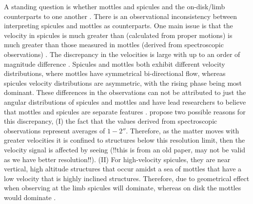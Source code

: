 \documentclass[12pt]{ociamthesis}
\newcommand{\np}{\\ \\}
\begin{document}
A standing question is whether mottles and spicules and the on-disk/limb counterparts to one another \citep{Tsiropoula1993A}. There is an observational inconsistency between interpreting spicules and mottles as counterparts. One main issue is that the velocity in spicules is much greater than (calculated from proper motions) is much greater than those measured in mottles (derived from spectroscopic observations) \citep{Grossmann1992AA264236G, Christopoulou2001SoPh19961C}. The discrepancy in the velocities is large with up to an order of magnitude difference \citep{Grossmann1973SoPh28319G}. Spicules and mottles both exhibit different velocity distributions, where mottles have symmetrical bi-directional flow, whereas spicules velocity distributions are asymmetric, with the rising phase being most dominant. These differences in the observations can not be attributed to just the angular distributions of spicules and mottles \citep{Grossmann1992AA264236G} and have lead researchers to believe that mottles and spicules are separate features \citep{Christopoulou2001SoPh19961C}. \cite{Christopoulou2001SoPh19961C} propose two possible reasons for this discrepancy, (I) the fact that the values derived from spectroscopic observations represent averages of $1-\ang{;;2}$. Therefore, as the matter moves with greater velocities it is confined to structures below this resolution limit, then the velocity signal is affected by seeing ({\color{green}!!this is from an old paper, may not be valid as we have better resolution!!)}. (II) For high-velocity spicules, they are near vertical, high altitude structures that occur amidst a sea of mottles that have a low velocity that is highly inclined structures. Therefore, due to geometrical effect when observing at the limb spicules will dominate, whereas on disk the mottles would dominate \citep{Grossmann1992AA264236G}. \np
\end{document}
